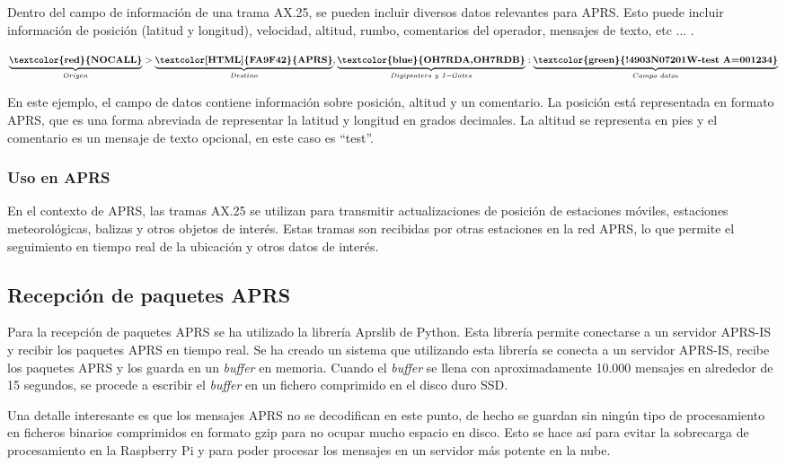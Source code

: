 Dentro del campo de información de una trama AX.25, se pueden incluir diversos datos relevantes para APRS. Esto puede incluir información de posición (latitud y longitud), velocidad, altitud, rumbo, comentarios del operador, mensajes de texto, etc ... \cite{APRSPaths}.

\[\underbrace{\textbf{\textcolor{red}{NOCALL}}}_{Origen}>\underbrace{\textbf{\textcolor[HTML]{FA9F42}{APRS}}}_{Destino}, \underbrace{\textbf{\textcolor{blue}{OH7RDA,OH7RDB}}}_{Digipeaters\ y\ I-Gates}:\underbrace{\textbf{\textcolor{green}{!4903N07201W-test A=001234}}}_{Campo\ datos}\]

En este ejemplo, el campo de datos contiene información sobre posición, altitud y un comentario. La posición está representada en formato APRS, que es una forma abreviada de representar la latitud y longitud en grados decimales. La altitud se representa en pies y el comentario es un mensaje de texto opcional, en este caso es ``test''.

\subsubsection*{Uso en APRS}

En el contexto de APRS, las tramas AX.25 se utilizan para transmitir actualizaciones de posición de estaciones móviles, estaciones meteorológicas, balizas y otros objetos de interés. Estas tramas son recibidas por otras estaciones en la red APRS, lo que permite el seguimiento en tiempo real de la ubicación y otros datos de interés.

\subsection{Recepción de paquetes APRS}

Para la recepción de paquetes APRS se ha utilizado la librería Aprslib de Python. Esta librería permite conectarse a un servidor APRS-IS y recibir los paquetes APRS en tiempo real. Se ha creado un sistema que utilizando esta librería se conecta a un servidor APRS-IS, recibe los paquetes APRS y los guarda en un \textit{buffer} en memoria. Cuando el \textit{buffer} se llena con aproximadamente 10.000 mensajes en alrededor de 15 segundos, se procede a escribir el \textit{buffer} en un fichero comprimido en el disco duro SSD.

Una detalle interesante es que los mensajes APRS no se decodifican en este punto, de hecho se guardan sin ningún tipo de procesamiento en ficheros binarios comprimidos en formato gzip para no ocupar mucho espacio en disco. Esto se hace así para evitar la sobrecarga de procesamiento en la Raspberry Pi y para poder procesar los mensajes en un servidor más potente en la nube.

